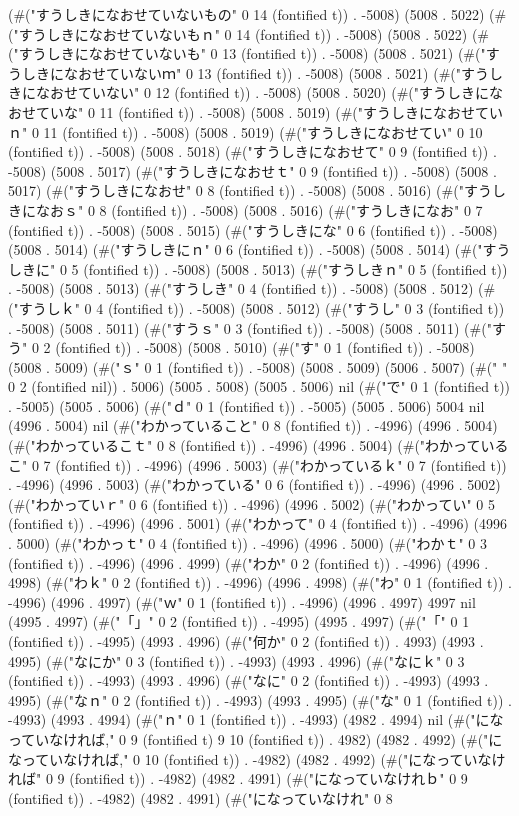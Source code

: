 (#("すうしきになおせていないもの" 0 14 (fontified t)) . -5008) (5008 . 5022) (#("すうしきになおせていないもｎ" 0 14 (fontified t)) . -5008) (5008 . 5022) (#("すうしきになおせていないも" 0 13 (fontified t)) . -5008) (5008 . 5021) (#("すうしきになおせていないｍ" 0 13 (fontified t)) . -5008) (5008 . 5021) (#("すうしきになおせていない" 0 12 (fontified t)) . -5008) (5008 . 5020) (#("すうしきになおせていな" 0 11 (fontified t)) . -5008) (5008 . 5019) (#("すうしきになおせていｎ" 0 11 (fontified t)) . -5008) (5008 . 5019) (#("すうしきになおせてい" 0 10 (fontified t)) . -5008) (5008 . 5018) (#("すうしきになおせて" 0 9 (fontified t)) . -5008) (5008 . 5017) (#("すうしきになおせｔ" 0 9 (fontified t)) . -5008) (5008 . 5017) (#("すうしきになおせ" 0 8 (fontified t)) . -5008) (5008 . 5016) (#("すうしきになおｓ" 0 8 (fontified t)) . -5008) (5008 . 5016) (#("すうしきになお" 0 7 (fontified t)) . -5008) (5008 . 5015) (#("すうしきにな" 0 6 (fontified t)) . -5008) (5008 . 5014) (#("すうしきにｎ" 0 6 (fontified t)) . -5008) (5008 . 5014) (#("すうしきに" 0 5 (fontified t)) . -5008) (5008 . 5013) (#("すうしきｎ" 0 5 (fontified t)) . -5008) (5008 . 5013) (#("すうしき" 0 4 (fontified t)) . -5008) (5008 . 5012) (#("すうしｋ" 0 4 (fontified t)) . -5008) (5008 . 5012) (#("すうし" 0 3 (fontified t)) . -5008) (5008 . 5011) (#("すうｓ" 0 3 (fontified t)) . -5008) (5008 . 5011) (#("すう" 0 2 (fontified t)) . -5008) (5008 . 5010) (#("す" 0 1 (fontified t)) . -5008) (5008 . 5009) (#("ｓ" 0 1 (fontified t)) . -5008) (5008 . 5009) (5006 . 5007) (#("  " 0 2 (fontified nil)) . 5006) (5005 . 5008) (5005 . 5006) nil (#("で" 0 1 (fontified t)) . -5005) (5005 . 5006) (#("ｄ" 0 1 (fontified t)) . -5005) (5005 . 5006) 5004 nil (4996 . 5004) nil (#("わかっていること" 0 8 (fontified t)) . -4996) (4996 . 5004) (#("わかっているこｔ" 0 8 (fontified t)) . -4996) (4996 . 5004) (#("わかっているこ" 0 7 (fontified t)) . -4996) (4996 . 5003) (#("わかっているｋ" 0 7 (fontified t)) . -4996) (4996 . 5003) (#("わかっている" 0 6 (fontified t)) . -4996) (4996 . 5002) (#("わかっていｒ" 0 6 (fontified t)) . -4996) (4996 . 5002) (#("わかってい" 0 5 (fontified t)) . -4996) (4996 . 5001) (#("わかって" 0 4 (fontified t)) . -4996) (4996 . 5000) (#("わかっｔ" 0 4 (fontified t)) . -4996) (4996 . 5000) (#("わかｔ" 0 3 (fontified t)) . -4996) (4996 . 4999) (#("わか" 0 2 (fontified t)) . -4996) (4996 . 4998) (#("わｋ" 0 2 (fontified t)) . -4996) (4996 . 4998) (#("わ" 0 1 (fontified t)) . -4996) (4996 . 4997) (#("ｗ" 0 1 (fontified t)) . -4996) (4996 . 4997) 4997 nil (4995 . 4997) (#("「」" 0 2 (fontified t)) . -4995) (4995 . 4997) (#("「" 0 1 (fontified t)) . -4995) (4993 . 4996) (#("何か" 0 2 (fontified t)) . 4993) (4993 . 4995) (#("なにか" 0 3 (fontified t)) . -4993) (4993 . 4996) (#("なにｋ" 0 3 (fontified t)) . -4993) (4993 . 4996) (#("なに" 0 2 (fontified t)) . -4993) (4993 . 4995) (#("なｎ" 0 2 (fontified t)) . -4993) (4993 . 4995) (#("な" 0 1 (fontified t)) . -4993) (4993 . 4994) (#("ｎ" 0 1 (fontified t)) . -4993) (4982 . 4994) nil (#("になっていなければ," 0 9 (fontified t) 9 10 (fontified t)) . 4982) (4982 . 4992) (#("になっていなければ," 0 10 (fontified t)) . -4982) (4982 . 4992) (#("になっていなければ" 0 9 (fontified t)) . -4982) (4982 . 4991) (#("になっていなけれｂ" 0 9 (fontified t)) . -4982) (4982 . 4991) (#("になっていなけれ" 0 8 
